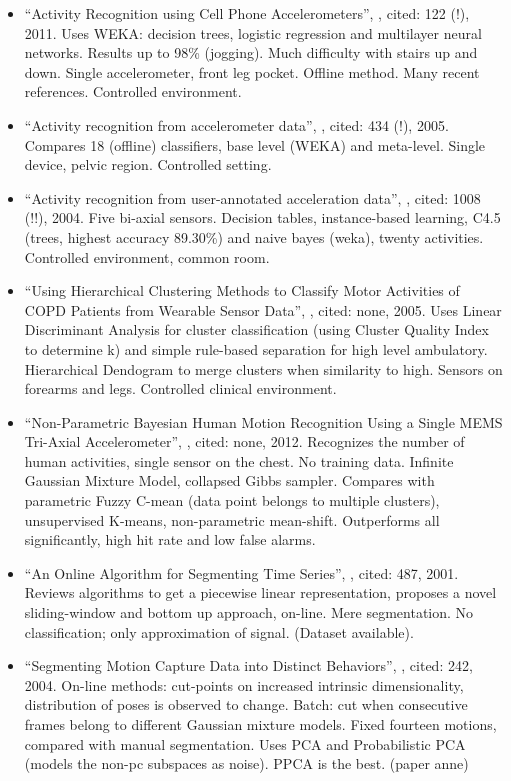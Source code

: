 \begin{itemize}
  \item ``Activity Recognition using Cell Phone Accelerometers'', \cite{kwapisz2011activity}, cited: 122 (!), 2011. Uses WEKA: decision trees, logistic regression and multilayer neural networks. Results up to 98\% (jogging). Much difficulty with stairs up and down. Single accelerometer, front leg pocket. Offline method. Many recent references. Controlled environment.
  \item ``Activity recognition from accelerometer data'', \cite{ravi2005activity}, cited: 434 (!), 2005. Compares 18 (offline) classifiers, base level (WEKA) and meta-level. Single device, pelvic region. Controlled setting.
  \item ``Activity recognition from user-annotated acceleration data'', \cite{bao2004activity}, cited: 1008 (!!), 2004. Five bi-axial sensors. Decision tables, instance-based learning, C4.5 (trees, highest accuracy 89.30\%) and naive bayes (weka), twenty activities. Controlled environment, common room.
  \item ``Using Hierarchical Clustering Methods to Classify Motor Activities of COPD Patients from Wearable Sensor Data'', \cite{sherril2005using}, cited: none, 2005. Uses Linear Discriminant Analysis for cluster classification (using Cluster Quality Index to determine k) and simple rule-based separation for high level ambulatory. Hierarchical Dendogram to merge clusters when similarity to high. Sensors on forearms and legs. Controlled clinical environment.
  \item ``Non-Parametric Bayesian Human Motion Recognition Using a Single MEMS Tri-Axial Accelerometer'', \cite{ahmed2012non}, cited: none, 2012. Recognizes the number of human activities, single sensor on the chest. No training data. Infinite Gaussian Mixture Model, collapsed Gibbs sampler. Compares with parametric Fuzzy C-mean (data point belongs to multiple clusters), unsupervised K-means, non-parametric mean-shift. Outperforms all significantly, high hit rate and low false alarms.
  \item ``An Online Algorithm for Segmenting Time Series'', \cite{keogh2001online}, cited: 487, 2001. Reviews algorithms to get a piecewise linear representation, proposes a novel sliding-window and bottom up approach, on-line. Mere segmentation. No classification; only approximation of signal. (Dataset available).
  \item ``Segmenting Motion Capture Data into Distinct Behaviors'', \cite{barbivc2004segmenting}, cited: 242, 2004. On-line methods: cut-points on increased intrinsic dimensionality, distribution of poses is observed to change. Batch: cut when consecutive frames belong to different Gaussian mixture models. Fixed fourteen motions, compared with manual segmentation. Uses PCA and Probabilistic PCA (models the non-pc subspaces as noise). PPCA is the best. (paper anne)

\end{itemize}
